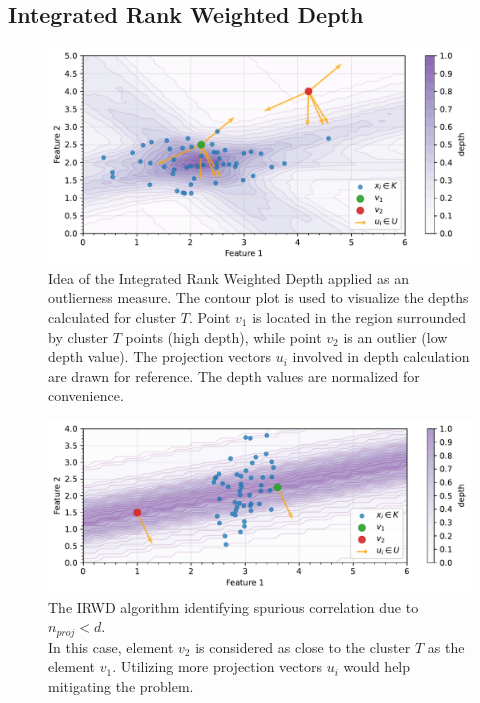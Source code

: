 \subsection{Integrated Rank Weighted Depth}
\label{section:IRWD}

\begin{figure}[t]
    \centering
    \includegraphics[width=\textwidth]{images/measures/irwd-distance.pdf}
    \caption{Idea of the Integrated Rank Weighted Depth applied as an outlierness measure.
             The contour plot is used to visualize the depths calculated for cluster $T$.
             Point $v_1$ is located in the region surrounded by cluster $T$ points (high depth),
             while point $v_2$ is an outlier (low depth value). The projection vectors $u_i$ involved in depth calculation are drawn for reference. The depth values are normalized for convenience.}
    \label{fig:irwd-idea}
\end{figure}

\begin{figure}[t]
    \centering
    \includegraphics[width=\textwidth]{images/measures/irwd-issue.pdf}
    \caption{The IRWD algorithm identifying spurious correlation due to $n_{proj} < d$.\\
             In this case, element $v_2$ is considered as close to the cluster $T$ as the element $v_1$.
             Utilizing more projection vectors $u_i$ would help mitigating the problem.}
    \label{fig:irwd-issue}
\end{figure}

